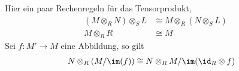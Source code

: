 \begin{defn}[Tensorprodukt]
\cite[3(Algebra).11.21]{stacks-project}
\begin{comment}
Faserprodukt: \cite[4(Categories).6.1]{stacks-project}
\end{comment}

\begin{center}
\end{center}
\begin{comment}
Für eine Abbildung $f:M\rightarrow M'$ definiere das Tensorprodukt davon über
$R$ mit $N$ als
\[
\id_N \otimes f:
\begin{array}[t]{ccc}
N\otimes_{R}M & \rightarrow & N\otimes_{R}M'\\
n\otimes m & \mapsto & n\otimes f(m)
\end{array}
\]
\end{comment}
\end{defn}
\begin{bem} \label{bem:Rechenregeln-Tensorprodukt}
Hier ein paar Rechenregeln für das Tensorprodukt,
\begin{align}
(M\otimes_R N)\otimes_S L &\cong M\otimes_R (N \otimes_S L)
  \label{bem:Rechenregeln-Tensorprodukt1}\\
M\otimes_R R &\cong M \label{bem:Rechenregeln-Tensorprodukt2}
\end{align}
Sei $f:M'\rightarrow M$ eine Abbildung, so gilt
\begin{align}
N\otimes_R(M/\im(f)) &\cong N\otimes_R M / \im(\id_{R}\otimes f)
\label{bem:Rechenregeln-Tensorprodukt3}
\end{align}
\end{bem}

